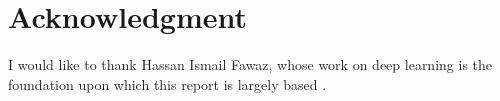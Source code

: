 \documentclass[journal]{IEEEtran}
\begin{document}











%


\section*{Acknowledgment}
I would like to thank Hassan Ismail Fawaz, whose work on deep learning is the foundation upon which this report is largely based \cite{IsmailFawaz2018deep}.


\ifCLASSOPTIONcaptionsoff
  \newpage
\fi
\end{document}
